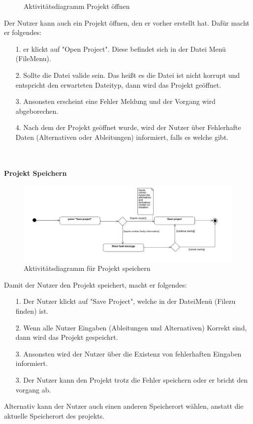 \documentclass{article}
\begin{document}
\begin{itemize}
\begin{figure}[H]
    \caption{Aktivitätsdiagramm Projekt öffnen}
\end{figure}
Der Nutzer kann auch ein Projekt öffnen, den er vorher erstellt hat. Dafür macht er folgendes:
\begin{enumerate}
    \item[1.] er klickt auf "Open Project". Diese befindet sich in der Datei Menü (FileMenu).
    \item[2.] Sollte die Datei valide sein. Das heißt es die Datei ist nicht korrupt und entspricht den erwarteten Dateityp, dann wird das Projekt geöffnet.
    \item[3.] Ansonsten erscheint eine Fehler Meldung und der Vorgang wird abgeborechen.
    \item[4.] Nach dem der Projekt geöffnet wurde, wird der Nutzer über Fehlerhafte Daten (Alternativen oder Ableitungen) informiert, falls es welche gibt. 
\end{enumerate}
\\\\
\textbf{\large{Projekt Speichern}}
\begin{figure}[H]%
    \centering
    \includegraphics[width=13cm]{entwurf/Entwurf_dokument/img/Alissa/SaveProjectAD.png}
    \caption{Aktivitätsdiagramm für Projekt speichern}
\end{figure}
Damit der Nutzer den Projekt speichert, macht er folgendes:
\begin{enumerate}
    \item[1.] Der Nutzer klickt auf "Save Project", welche in der Datei\textendash Menü (File\textendash zu finden) ist.
    \item[2.] Wenn alle Nutzer Eingaben (Ableitungen und Alternativen) Korrekt sind, dann wird das Projekt gespeichrt.
    \item[3.] Ansonsten wird der Nutzer über die Existenz von fehlerhaften Eingaben informiert.
    \item[3.] Der Nutzer kann den Projekt trotz die Fehler speichern oder er bricht den vorgang ab. 
\end{enumerate}
Alternativ kann der Nutzer auch einen anderen Speicherort wählen, anstatt die aktuelle Speicherort des projekts.


\end{itemize}
\end{document}
